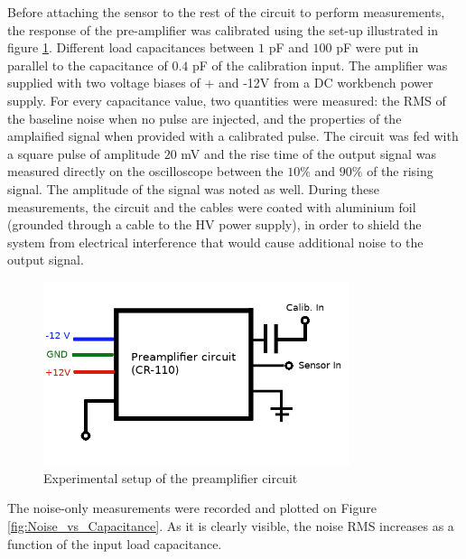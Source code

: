 \documentclass[12pt]{article}
\begin{document}
Before attaching the sensor to the rest of the circuit to perform measurements, the response of the pre-amplifier was calibrated using the set-up illustrated in figure \ref{fig:preampsetup}. Different load capacitances between $1$ pF and $100$ pF were put in parallel to the capacitance of $0.4$ pF of the calibration input. The amplifier was supplied with two voltage biases of + and -12V from a DC workbench power supply. For every capacitance value, two quantities were measured: the RMS of the baseline noise when no pulse are injected, and the properties of the amplaified signal when provided with a calibrated pulse.  The circuit was fed with a square pulse of amplitude $20$ mV and the rise time of the output signal was measured directly on the oscilloscope between the $10\%$ and $90\%$ of the rising signal. The amplitude of the signal was noted as well. During these measurements, the circuit and the cables were coated with aluminium foil (grounded through a cable to the HV power supply), in order to shield the system from electrical interference that would cause additional noise to the output signal.

\begin{figure}[H]
  \centering
  \includegraphics[width=0.8\textwidth]{./graphics/experimental_preamp_setup.png}
  \caption{Experimental setup of the preamplifier circuit}
  \label{fig:preampsetup}
\end{figure}


The noise-only measurements were recorded and plotted on Figure \ref{fig:Noise_vs_Capacitance}. As it is clearly visible, the noise RMS increases as a function of the input load capacitance.
\end{document}
